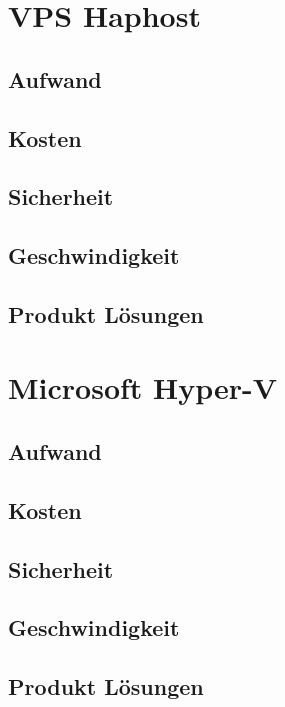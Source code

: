 \section{VPS Haphost}
\subsection{Aufwand}

\subsection{Kosten}

\subsection{Sicherheit}

\subsection{Geschwindigkeit}

\subsection{Produkt Lösungen}



\section{Microsoft Hyper-V}
\subsection{Aufwand}

\subsection{Kosten}

\subsection{Sicherheit}

\subsection{Geschwindigkeit}

\subsection{Produkt Lösungen}



